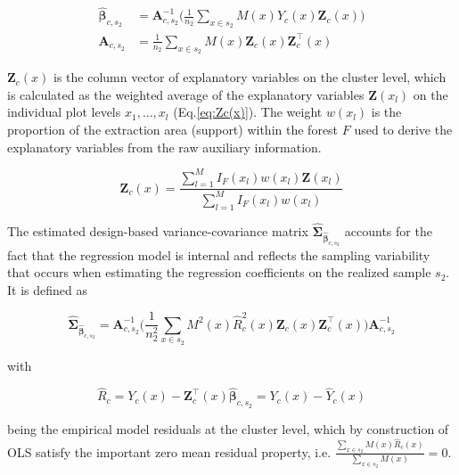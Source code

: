 \documentclass[remotesensing,article,submit,moreauthors,pdftex,10pt,a4paper]{mdpi}
\begin{document}
\begin{subequations}\label{normequ_simple_cluster}
	\begin{align}
	\hat{\pmb{\beta}}_{c,s_2} &= \pmb{A}_{c,s_2}^{-1} \Big(\frac{1}{n_2}\sum_{x\in{s_2}}M(x)Y_{c}(x)\pmb{Z}_{c}(x)\Big) \\
	\pmb{A}_{c,s_2} &=\frac{1}{n_2}\sum_{x\in{s_2}}M(x)\pmb{Z}_{c}(x)\pmb{Z}_{c}^{\top}(x)
	\end{align}
\end{subequations}

\noindent $\pmb{Z}_{c}(x)$ is the column vector of explanatory variables on the cluster level, which is calculated as the weighted average of the explanatory variables $\pmb{Z}(x_l)$ on the individual plot levels $x_1, ..., x_l$ (Eq.\ref{eq:Zc(x)}). The weight $w(x_l)$ is the proportion of the extraction area (support) within the forest $F$ used to derive the explanatory variables from the raw auxiliary information.

\begin{equation}\label{eq:Zc(x)}
\pmb{Z}_{c}(x)=\frac{\sum_{l=1}^{M}I_{F}(x_l)w(x_l)\pmb{Z}(x_l)}{\sum_{l=1}^{M}I_{F}(x_l)w(x_l)}
\end{equation}

\noindent The estimated design-based variance-covariance matrix $\hat{\pmb{\Sigma}}_{\hat{\pmb{\beta}}_{c,s_2}}$ accounts for the fact that the regression model is internal and reflects the sampling variability that occurs when estimating the regression coefficients on the realized sample $s_2$. It is defined as

\begin{equation}\label{eq:varcovarbeta}
\hat{\pmb{\Sigma}}_{\hat{\pmb{\beta}}_{c,s_2}}=\pmb{A}_{c,s_2}^{-1}
\Big(\frac{1}{n_2^2}\sum_{x\in{s_2}}M^{2}(x)\hat{R}_{c}^2(x)\pmb{Z}_{c}(x)\pmb{Z}_{c}^{\top}(x)\Big)
\pmb{A}_{c,s_2}^{-1}
\end{equation}

\noindent with 

\begin{equation}\label{eq:globresids}
\hat{R}_{c}=Y_{c}(x)-\pmb{Z}_{c}^{\top}(x)\hat{\pmb{\beta}}_{c,s_2} = Y_{c}(x) - \hat{Y}_{c}(x)
\end{equation}

\noindent being the empirical model residuals at the cluster level, which by construction of OLS satisfy the important zero mean residual property, i.e. $\frac{\sum_{x \in s_{2}} M(x) \hat{R}_{c}(x)}{\sum_{x \in s_{2}} M(x)}=0$.\\
\end{document}
